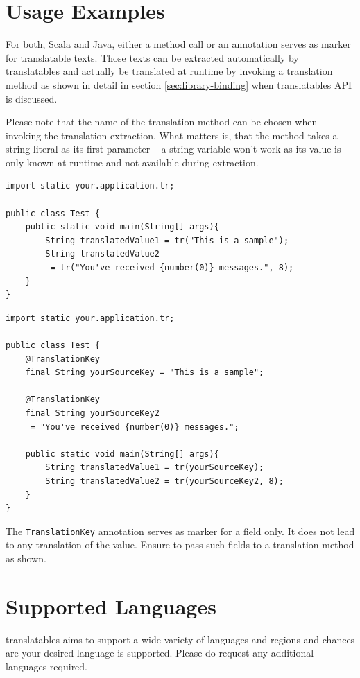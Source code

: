 \documentclass[a4paper,11pt,twoside]{report}
\begin{document}
\section{Usage Examples}
For both, Scala and Java, either a method call or an annotation serves as marker for translatable texts. Those texts can be extracted automatically by translatables and actually be translated at runtime by invoking a translation method as shown in detail in section \vref{sec:library-binding} when translatables \ac{API} is discussed.

Please note that the name of the translation method can be chosen when invoking the translation extraction. What matters is, that the method takes a string literal as its first parameter – a string variable won't work as its value is only known at runtime and not available during extraction.

\begin{lstlisting}[caption=Methods as markers]
import static your.application.tr;

public class Test {
	public static void main(String[] args){
		String translatedValue1 = tr("This is a sample");
		String translatedValue2
		 = tr("You've received {number(0)} messages.", 8);
	}
}
\end{lstlisting}

\begin{lstlisting}[caption=Annotations as markers]
import static your.application.tr;

public class Test {
	@TranslationKey
	final String yourSourceKey = "This is a sample";
	
	@TranslationKey
	final String yourSourceKey2
	 = "You've received {number(0)} messages.";
	
	public static void main(String[] args){
		String translatedValue1 = tr(yourSourceKey);
		String translatedValue2 = tr(yourSourceKey2, 8);
	}
}
\end{lstlisting}

The \lstinline$TranslationKey$ annotation serves as marker for a field only. It does not lead to any translation of the value. Ensure to pass such fields to a translation method as shown.

\section{Supported Languages}
translatables aims to support a wide variety of languages and regions and chances are your desired language is supported. Please do request any additional languages required.
\end{document}
